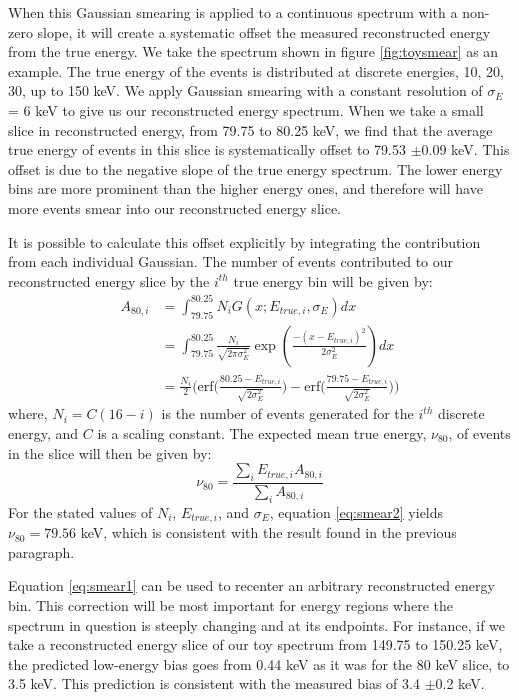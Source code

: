 When this Gaussian smearing is applied to a continuous spectrum with a non-zero slope, it will create a systematic offset the measured reconstructed energy from the true energy. We take the spectrum shown in figure \ref{fig:toysmear} as an example. The true energy of the events is distributed at discrete energies, 10, 20, 30, up to 150 keV. We apply Gaussian smearing with a constant resolution of $\sigma_{E}$= 6 keV to give us our reconstructed energy spectrum. When we take a small slice in reconstructed energy, from 79.75 to 80.25 keV, we find that the average true energy of events in this slice is systematically offset to 79.53 $\pm$0.09 keV. This offset is due to the negative slope of the true energy spectrum. The lower energy bins are more prominent than the higher energy ones, and therefore will have more events smear into our reconstructed energy slice.

It is possible to calculate this offset explicitly by integrating the contribution from each individual Gaussian. The number of events contributed to our reconstructed energy slice by the $i^{th}$ true energy bin will be given by:
\begin{equation}\label{eq:smear1}
\begin{split}
A_{80,i}&=\int_{79.75}^{80.25}N_iG(x;E_{true,i},\sigma_E)dx\\
&=\int_{79.75}^{80.25}\frac{N_i}{\sqrt{2\pi \sigma_{E}^{2}}} \exp \left(\frac{-(x-E_{true,i})^2}{2\sigma_{E}^{2}}\right)dx\\
&=\frac{N_i}{2} \Bigg(\text{erf} \bigg(\frac{80.25-E_{true,i}}{\sqrt{2\sigma_E^2}}\bigg)-\text{erf} \bigg(\frac{79.75-E_{true,i}}{\sqrt{2\sigma_E^2}}\bigg)\Bigg)
\end{split}
\end{equation}
where, $N_i=C(16-i)$ is the number of events generated for  the $i^{th}$ discrete energy, and $C$ is a scaling constant. The expected mean true energy, $\nu_{80}$, of events in the slice will then be given by:
\begin{equation}\label{eq:smear2}
\nu_{80}=\frac{\sum_i E_{true,i}A_{80,i}}{\sum_i A_{80,i}}
\end{equation}
For the stated values of $N_i$, $E_{true,i}$, and $\sigma_E$, equation \ref{eq:smear2} yields $\nu_{80}=79.56$ keV, which is consistent with the result found in the previous paragraph.  

Equation \ref{eq:smear1} can be used to recenter an arbitrary reconstructed energy bin. This correction will be most important for energy regions where the spectrum in question is steeply changing and at its endpoints. For instance, if we take a reconstructed energy slice of our toy spectrum from 149.75 to 150.25 keV, the predicted low-energy bias goes from 0.44 keV as it was for the 80 keV slice, to 3.5 keV. This prediction is consistent with the measured bias of 3.4 $\pm$0.2 keV.

